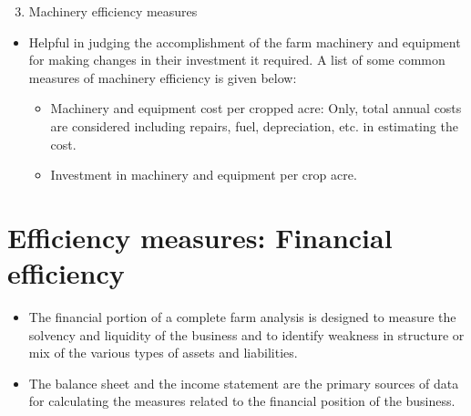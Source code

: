 \documentclass[12pt,ignorenonframetext,aspectratio=169]{beamer}
\providecommand{\tightlist}{%
  \setlength{\itemsep}{0pt}\setlength{\parskip}{0pt}}
\begin{document}
\begin{frame}{}
\protect\hypertarget{section-4}{}
\begin{enumerate}
\setcounter{enumi}{2}
\tightlist
\item
  Machinery efficiency measures
\end{enumerate}

\begin{itemize}
\tightlist
\item
  Helpful in judging the accomplishment of the farm machinery and
  equipment for making changes in their investment it required. A list
  of some common measures of machinery efficiency is given below:

  \begin{itemize}
  \tightlist
  \item
    Machinery and equipment cost per cropped acre: Only, total annual
    costs are considered including repairs, fuel, depreciation, etc. in
    estimating the cost.
  \item
    Investment in machinery and equipment per crop acre.
  \end{itemize}
\end{itemize}
\end{frame}

\hypertarget{efficiency-measures-financial-efficiency}{%
\section{Efficiency measures: Financial
efficiency}\label{efficiency-measures-financial-efficiency}}

\begin{frame}{}
\protect\hypertarget{section-5}{}
\begin{itemize}
\tightlist
\item
  The financial portion of a complete farm analysis is designed to
  measure the solvency and liquidity of the business and to identify
  weakness in structure or mix of the various types of assets and
  liabilities.
\item
  The balance sheet and the income statement are the primary sources of
  data for calculating the measures related to the financial position of
  the business.
\end{itemize}
\end{frame}
\end{document}
